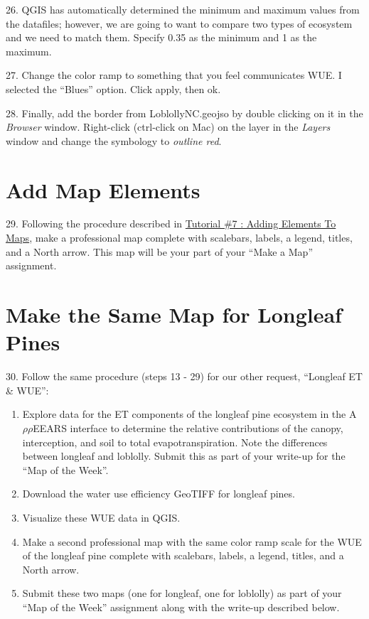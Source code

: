 \documentclass[oneside,a4paper,11pt,explicit]{book}
\begin{document}
26. QGIS has automatically determined the minimum and maximum values from the datafiles; however, we are going to want to compare two types of ecosystem and we need to match them. Specify 0.35 as the minimum and 1 as the maximum. 

27. Change the color ramp to something that you feel communicates WUE. I selected the ``Blues'' option. Click apply, then ok.

28. Finally, add the border from LoblollyNC.geojso by double clicking on it in the \textit{Browser} window. Right-click (ctrl-click on Mac) on the layer in the \textit{Layers} window and change the symbology to \textit{outline red}. 


\section{Add Map Elements}

29. Following the procedure described in \href{https://jeremydforsythe.github.io/icecream-tutorials/Tutorial7_AddingElementsToMaps1/Tutorial7_AddingElementsToMaps1.pdf}{Tutorial \#7 : Adding Elements To Maps}, make a professional map complete with scalebars, labels, a legend, titles, and a North arrow. This map will be your part of your ``Make a Map'' assignment.


\section{Make the Same Map for Longleaf Pines}

30. Follow the same procedure (steps 13 - 29) for our other request, ``Longleaf ET \& WUE'':

\begin{enumerate}
	\item Explore data for the ET components of the longleaf pine ecosystem in the A$\rho\rho$EEARS interface to determine the relative contributions of the canopy, interception, and soil to total evapotranspiration. Note the differences between longleaf and loblolly. Submit this as part of your write-up for the ``Map of the Week''.
	\item Download the water use efficiency GeoTIFF for longleaf pines.
	\item Visualize these WUE data in QGIS.
	\item Make a second professional map with the same color ramp scale for the WUE of the longleaf pine complete with scalebars, labels, a legend, titles, and a North arrow.
	\item Submit these two maps (one for longleaf, one for loblolly) as part of your ``Map of the Week'' assignment along with the write-up described below.
\end{enumerate}
\end{document}
